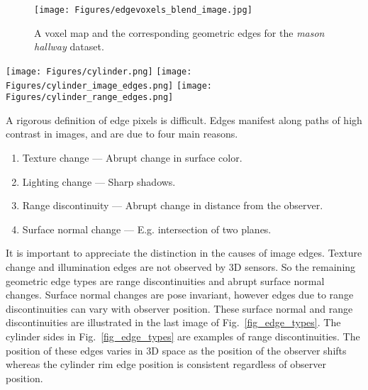 \documentclass{article} %
\begin{document}
\begin{figure}
    \centering
    \texttt{[image: Figures/edgevoxels\_blend\_image.jpg]}
    \caption{A voxel map and the corresponding geometric edges for the \textit{mason hallway} dataset.}
    \label{fig_voxel_edge_map_example}
\end{figure}


\begin{figure*}[t]
	\centering
    \texttt{[image: Figures/cylinder.png]}
    \texttt{[image: Figures/cylinder\_image\_edges.png]}
    \texttt{[image: Figures/cylinder\_range\_edges.png]}
    \caption{Image with associated edges due to appearance and due to geometry.}
    \label{fig_edge_types}
\end{figure*}

A rigorous definition of edge pixels is difficult.  Edges manifest along paths of high contrast in images, and are due to four main reasons.
\begin{enumerate}
\item Texture change --- Abrupt change in surface color.
\item Lighting change --- Sharp shadows.
\item Range discontinuity --- Abrupt change in distance from the observer.
\item Surface normal change --- E.g. intersection of two planes.
\end{enumerate}

It is important to appreciate the distinction in the causes of image edges.   Texture change and illumination edges are not observed by 3D sensors. So the remaining geometric edge types are range discontinuities and abrupt surface normal changes.  Surface normal changes are pose invariant, however edges due to range discontinuities can vary with observer position.
These surface normal and range discontinuities are illustrated in the last image of Fig.~\ref{fig_edge_types}.  The cylinder sides in Fig.~\ref{fig_edge_types} are examples of range discontinuities.  The position of these edges varies in 3D space as the position of the observer shifts whereas the cylinder rim edge position is consistent regardless of observer position.
\end{document}
